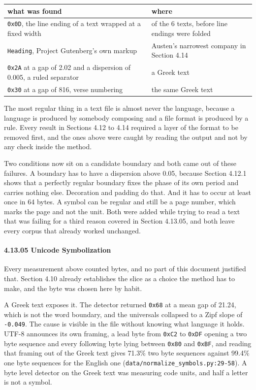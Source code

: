 \tiny
\setlength{\tabcolsep}{2pt}
\begin{longtable}{@{}>{\raggedright\arraybackslash}p{}>{\raggedright\arraybackslash}p{}@{}}
\toprule
what was found & where \\
\midrule
\texttt{0x0D}, the line ending of a text wrapped at a fixed width & 5 of the 6 texts, before line endings were folded \\
\texttt{Heading}, Project Gutenberg's own markup & Austen's narrowest company in Section 4.14 \\
\texttt{0x2A} at a gap of 2.02 and a dispersion of 0.005, a ruled separator & a Greek text \\
\texttt{0x30} at a gap of 816, verse numbering & the same Greek text \\
\bottomrule
\end{longtable}
\normalsize

The most regular thing in a text file is almost never the language, because a language is produced by somebody composing and a file format is produced by a rule. Every result in Sections 4.12 to 4.14 required a layer of the format to be removed first, and the ones above were caught by reading the output and not by any check inside the method.

Two conditions now sit on a candidate boundary and both came out of these failures. A boundary has to have a dispersion above 0.05, because Section 4.12.1 shows that a perfectly regular boundary fixes the phase of its own period and carries nothing else. Decoration and padding do that. And it has to occur at least once in 64 bytes. A symbol can be regular and still be a page number, which marks the page and not the unit. Both were added while trying to read a text that was failing for a third reason covered in Section 4.13.05, and both leave every corpus that already worked unchanged.

\paragraph{4.13.05 Unicode Symbolization}

Every measurement above counted bytes, and no part of this document justified that. Section 4.10 already establishes the slice as a choice the method has to make, and the byte was chosen here by habit.

A Greek text exposes it. The detector returned \texttt{0x68} at a mean gap of 21.24, which is not the word boundary, and the universals collapsed to a Zipf slope of \texttt{-\allowbreak{}0.\allowbreak{}049}. The cause is visible in the file without knowing what language it holds. UTF-8 announces its own framing, a lead byte from \texttt{0x\allowbreak{}C2} to \texttt{0x\allowbreak{}DF} opening a two byte sequence and every following byte lying between \texttt{0x80} and \texttt{0x\allowbreak{}BF}, and reading that framing out of the Greek text gives 71.3\% two byte sequences against 99.4\% one byte sequences for the English one (\texttt{data/\allowbreak{}normalize\_\allowbreak{}symbols.\allowbreak{}py:29-\allowbreak{}58}). A byte level detector on the Greek text was measuring code units, and half a letter is not a symbol.

